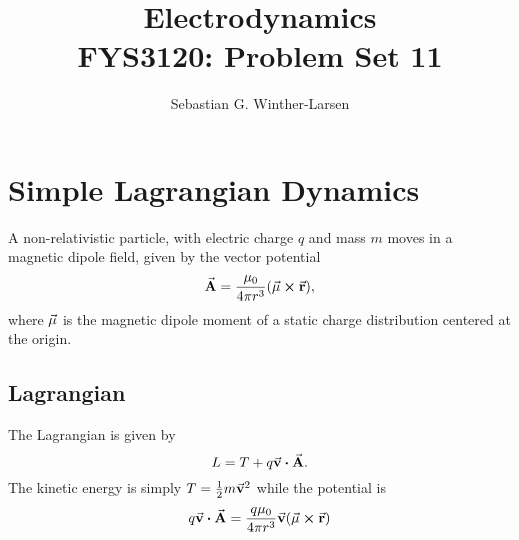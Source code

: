 \documentclass[11pt]{amsart}
\title{Electrodynamics \\
	\hrulefill \small{ FYS3120: Problem Set 11 } \hrulefill}
\author[Winther-Larsen]{Sebastian G. Winther-Larsen}
\begin{document}
\maketitle

\section{Simple Lagrangian Dynamics}

A non-relativistic particle, with electric charge $q$ and mass $m$ moves in a magnetic dipole field, given by the vector potential
\begin{equation}
\va{A} = \frac{\mu_0}{4\pi r^3}(\va{\mu} \cp \va{r}),
\end{equation}
where $\va{\mu}$ is the magnetic dipole moment of a static charge distribution centered at the origin.

\subsection{Lagrangian}
The Lagrangian is given by
\begin{equation}
\label{eq:lagrangian1}
L = T + q\va{v} \vdot \va{A}.
\end{equation}
The kinetic energy is simply $T = \frac{1}{2}m\va{v}^2$ while the potential is
\begin{align*}
q\va{v} \vdot \va{A} = \frac{q\mu_0}{4\pi r^3}\va{v}(\va{\mu} \cp \va{r})
\end{align*}
\end{document}
